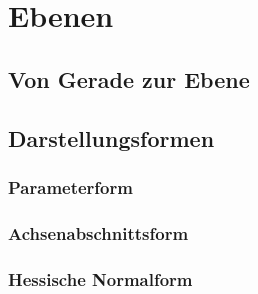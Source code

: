 \documentclass[a4paper,12pt]{article}
\begin{document}
	\section{Ebenen}
	\subsection{Von Gerade zur Ebene}
	\subsection{Darstellungsformen}
	\subsubsection{Parameterform}
	\subsubsection{Achsenabschnittsform}
	\subsubsection{Hessische Normalform}
	
\end{document}
